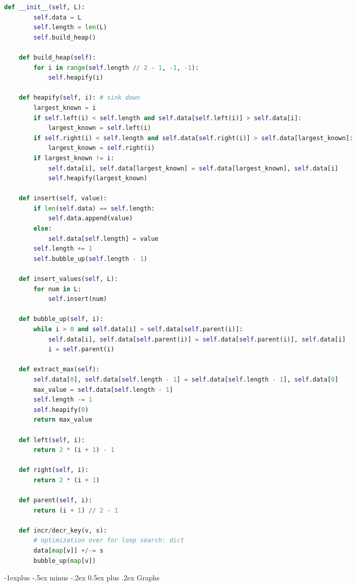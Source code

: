 \documentclass[letterpaper, 8pt]{extarticle}
\makeatletter
\renewcommand{\section}{\@startsection{section}{1}{0mm}%
                                {-1explus -.5ex minus -.2ex}%
                                {0.5ex plus .2ex}%
                                {\normalfont\normalsize\bfseries}}
\makeatother
\begin{document}
\begin{multicols*}{5}
\begin{lstlisting}[language=Python, breaklines=true, postbreak=\mbox{\textcolor{red}{$\hookrightarrow$}\space}]
    def __init__(self, L):
        self.data = L
        self.length = len(L)
        self.build_heap()

    def build_heap(self):
        for i in range(self.length // 2 - 1, -1, -1):
            self.heapify(i)

    def heapify(self, i): # sink down
        largest_known = i
        if self.left(i) < self.length and self.data[self.left(i)] > self.data[i]:
            largest_known = self.left(i)
        if self.right(i) < self.length and self.data[self.right(i)] > self.data[largest_known]:
            largest_known = self.right(i)
        if largest_known != i:
            self.data[i], self.data[largest_known] = self.data[largest_known], self.data[i]
            self.heapify(largest_known)

    def insert(self, value):
        if len(self.data) == self.length:
            self.data.append(value)
        else:
            self.data[self.length] = value
        self.length += 1
        self.bubble_up(self.length - 1)

    def insert_values(self, L):
        for num in L:
            self.insert(num)

    def bubble_up(self, i):
        while i > 0 and self.data[i] > self.data[self.parent(i)]:
            self.data[i], self.data[self.parent(i)] = self.data[self.parent(i)], self.data[i]
            i = self.parent(i)

    def extract_max(self):
        self.data[0], self.data[self.length - 1] = self.data[self.length - 1], self.data[0]
        max_value = self.data[self.length - 1]
        self.length -= 1
        self.heapify(0)
        return max_value

    def left(self, i):
        return 2 * (i + 1) - 1

    def right(self, i):
        return 2 * (i + 1)

    def parent(self, i):
        return (i + 1) // 2 - 1

    def incr/decr_key(v, s):
        # optimization over for loop search: dict
        data[map[v]] +/-= s
        bubble_up(map[v])
  \end{lstlisting}
\section{Graphs}

\end{multicols*}
\end{document}
